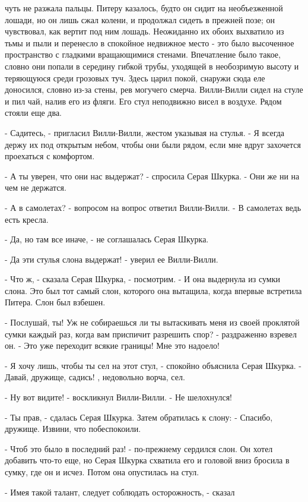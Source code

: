 чуть не разжала пальцы. Питеру казалось, будто он сидит на 
необъезженной лошади, но он лишь сжал колени, и продолжал сидеть в 
прежней позе; он чувствовал, как вертит под ним лошадь. Неожиданно их 
обоих выхватило из тьмы и пыли и перенесло в спокойное недвижное место 
- это было высоченное пространство с гладкими вращающимися стенами. 
Впечатление было такое, словно они попали в середину гибкой трубы, 
уходящей в необозримую высоту и теряющуюся среди грозовых туч. Здесь 
царил покой, снаружи сюда еле доносился, словно из-за стены, рев 
могучего смерча.
 Вилли-Вилли сидел на стуле и пил чай, налив его из фляги. Его 
стул неподвижно висел в воздухе. Рядом стояли еще два.
\par- Садитесь, - пригласил Вилли-Вилли, жестом указывая на стулья. - 
Я всегда держу их под открытым небом, чтобы они были рядом, если мне 
вдруг захочется проехаться с комфортом.
\par- А ты уверен, что они нас выдержат? - спросила Серая Шкурка. - 
Они же ни на чем не держатся.
\par- А в самолетах? - вопросом на вопрос ответил Вилли-Вилли. - В 
самолетах ведь есть кресла.
\par- Да, но там все иначе, - не соглашалась Серая Шкурка.
\par- Да эти стулья слона выдержат! - уверил ее Вилли-Вилли.
\par- Что ж, - сказала Серая Шкурка, - посмотрим. - И она выдернула из 
сумки слона. Это был тот самый слон, которого она вытащила, когда 
впервые встретила Питера. Слон был взбешен.
\par- Послушай, ты! Уж не собираешься ли ты вытаскивать меня из своей 
проклятой сумки каждый раз, когда вам приспичит разрешить спор? - 
раздраженно взревел он. - Это уже переходит всякие границы! Мне это 
надоело!
\par- Я хочу лишь, чтобы ты сел на этот стул, - спокойно объяснила 
Серая Шкурка. - Давай, дружище, садись!
, недовольно ворча, сел.
\par- Ну вот видите! - воскликнул Вилли-Вилли. - Не шелохнулся!
\par- Ты прав, - сдалась Серая Шкурка. Затем обратилась к слону: - 
Спасибо, дружище. Извини, что побеспокоили.
\par- Чтоб это было в последний раз! - по-прежнему сердился слон. Он 
хотел добавить что-то еще, но Серая Шкурка схватила его и головой вниз 
бросила в сумку, где он и исчез. Потом она опустилась на стул.
\par- Имея такой талант, следует соблюдать осторожность, - сказал 
